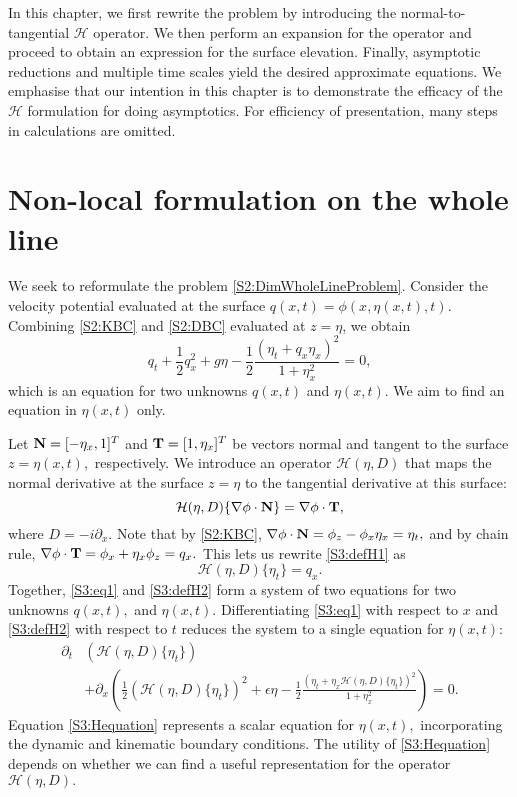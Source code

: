 In this chapter, we first rewrite the problem by introducing the normal-to-tangential $\mathcal{H}$ operator. We then perform an expansion for the operator and proceed to obtain an expression for the surface elevation. Finally, asymptotic reductions and multiple time scales yield the desired approximate equations. We emphasise that our intention in this chapter is to demonstrate the efficacy of the $\mathcal{H}$ formulation for doing asymptotics. For efficiency of presentation, many steps in calculations are omitted. 

\section{Non-local formulation on the whole line}
We seek to reformulate the problem \eqref{S2:DimWholeLineProblem}. Consider the velocity potential evaluated at the surface $q(x,t ) = \phi (x, \eta(x, t),t).$ Combining \eqref{S2:KBC} and \eqref{S2:DBC} evaluated at $z = \eta$, we obtain 
\begin{equation}\label{S3:eq1}
q_t + \frac{1}{2}q_x^2 + g \eta - \frac{1}{2} \frac{(\eta_t + q_x \eta_x)^2}{1 + \eta_x^2} = 0,
\end{equation}
which is an equation for two unknowns $q(x,t)$ and $\eta(x,t).$ We aim to find an equation in $\eta(x,t)$ only. 

Let ${\bf N} = [-\eta_x, 1]^T$ and ${\bf T} =[1, \eta_x ]^T$ be vectors normal and tangent to the surface $z =\eta(x,t),$ respectively. We introduce an operator $\mathcal{H}(\eta, D)$ that maps the normal derivative at the surface $z = \eta$ to the tangential derivative at this surface:
\begin{equation}\label{S3:defH1}
\mathcal{H}(\eta, D) \{ \nabla \phi \cdot {\bf N} \} = \nabla \phi \cdot {\bf T},
\end{equation}
where $D = - i \partial_x.$ Note that by \eqref{S2:KBC}, $\nabla \phi \cdot {\bf N} = \phi_z - \phi_x \eta_x = \eta_t,$ and by chain rule, $\nabla \phi \cdot {\bf T} = \phi_x + \eta_x \phi_z = q_x.$ This lets us rewrite \eqref{S3:defH1} as 
\begin{equation}\label{S3:defH2}
\mathcal{H}(\eta, D) \{ \eta_t \} = q_x.
\end{equation}
Together, \eqref{S3:eq1} and \eqref{S3:defH2} form a system of two equations for two unknowns $q(x,t),$ and $\eta(x,t).$ Differentiating \eqref{S3:eq1} with respect to $x$ and \eqref{S3:defH2} with respect to $t$ reduces the system to a single equation for $\eta(x,t):$
\begin{equation}\label{S3:Hequation}
\begin{aligned}
\partial_t&\left(\mathcal{H}(\eta, D)\{ \eta_t\} \right) \\
&+ \partial_x\left( \frac{1}{2}\left(\mathcal{H}(\eta, D)\{\eta_t\} \right)^2 + \epsilon \eta - \frac{1}{2} \frac{(\eta_t + \eta_x \mathcal{H}(\eta, D)\{ \eta_t\})^2}{1+\eta_x^2}\right) = 0.
\end{aligned}
\end{equation}
Equation \eqref{S3:Hequation} represents a scalar equation for $\eta(x,t),$ incorporating the dynamic and kinematic boundary conditions. The utility of \eqref{S3:Hequation} depends on whether we can find a useful representation for the operator $\mathcal{H}(\eta, D).$

